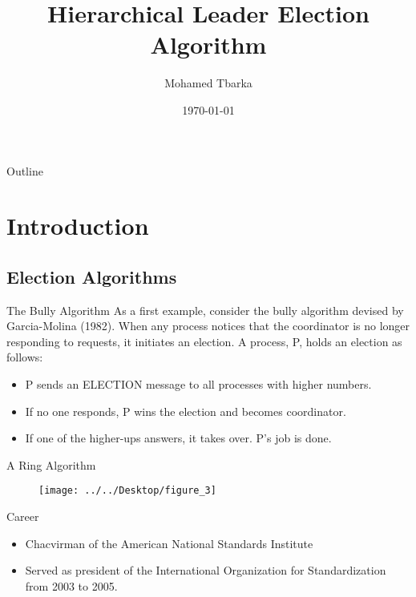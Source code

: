 \documentclass{beamer}
\title{Hierarchical Leader Election Algorithm}
\author{Mohamed Tbarka}
\date{\today}
\begin{document}

\frame{\titlepage}

\section[Outline]{}
\begin{frame}{Outline}
  \tableofcontents
\end{frame}

\section{Introduction}
\subsection{Election Algorithms}
\begin{frame}{The Bully Algorithm}
  As a first example, consider the bully algorithm devised by Garcia-Molina (1982). When any process notices that the coordinator is no longer responding to requests, it initiates an election. A process, P, holds an election as follows:
  \pause
  \begin{itemize}
    \item <2-> P sends an ELECTION message to all processes with higher numbers.
    \item <3-> If no one responds, P wins the election and becomes coordinator.
    \item <4-> If one of the higher-ups answers, it takes over. P's job is done.

  \end{itemize}
\end{frame}
\begin{frame}{A Ring Algorithm}
  \begin{figure}[h]
  	\centering
  	\texttt{[image: ../../Desktop/figure\_3]}

  	\label{fig:figure1}
  \end{figure}
  
\end{frame}

\begin{frame}{Career}
  \begin{itemize}
    \item<1-> Chacvirman of the American National Standards Institute 
    \item<2-> Served as president of the International Organization for Standardization from 2003 to 2005.
  \end{itemize}
\end{frame}
\end{document}
